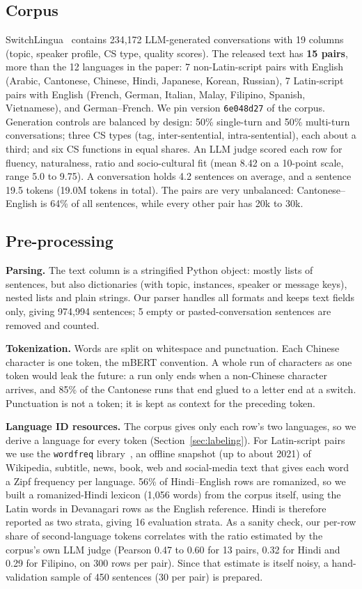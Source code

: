 \documentclass[sigconf,nonacm]{acmart}
\begin{document}
\subsection{Corpus}
SwitchLingua~\cite{xie2025switchlingua} contains 234,172 LLM-generated conversations with 19 columns (topic,
speaker profile, CS type, quality scores). The released text has \textbf{15 pairs}, more than the 12 languages
in the paper: 7 non-Latin-script pairs with English (Arabic, Cantonese, Chinese, Hindi, Japanese, Korean,
Russian), 7 Latin-script pairs with English (French, German, Italian, Malay, Filipino, Spanish, Vietnamese), and
German--French. We pin version \texttt{6e048d27} of the corpus. Generation controls are balanced by design:
50\% single-turn and 50\% multi-turn conversations; three CS types (tag, inter-sentential, intra-sentential),
each about a third; and six CS functions in equal shares. An LLM judge scored each row for fluency,
naturalness, ratio and socio-cultural fit (mean 8.42 on a 10-point scale, range 5.0 to 9.75). A
conversation holds 4.2 sentences on average, and a sentence 19.5 tokens (19.0M tokens in total). The pairs
are very unbalanced: Cantonese--English is 64\% of all sentences, while every other pair has 20k to 30k.

\subsection{Pre-processing}
\textbf{Parsing.} The text column is a stringified Python object: mostly lists of sentences, but also
dictionaries (with topic, instances, speaker or message keys), nested lists and plain strings. Our parser handles all formats and keeps text fields only, giving 974,994 sentences; 5 empty or
pasted-conversation sentences are removed and counted.

\textbf{Tokenization.} Words are split on whitespace and punctuation. Each Chinese character is one token, the
mBERT convention. A whole run of characters as one token would leak the future: a run only ends when a
non-Chinese character arrives, and 85\% of the Cantonese runs that end glued to a letter end at a switch.
Punctuation is not a token; it is kept as context for the preceding token.

\textbf{Language ID resources.} The corpus gives only each row's two languages, so we derive a language for
every token (Section~\ref{sec:labeling}). For Latin-script pairs we use the \texttt{wordfreq}
library~\cite{speer2022wordfreq}, an offline snapshot (up to about 2021) of Wikipedia, subtitle, news, book,
web and social-media text that gives each word a Zipf frequency per language. 56\% of Hindi--English rows are
romanized, so we built a romanized-Hindi lexicon (1,056 words) from the corpus itself, using the Latin words
in Devanagari rows as the English reference. Hindi is therefore reported as two strata, giving 16 evaluation
strata. As a sanity check, our per-row share of second-language tokens correlates with the ratio estimated
by the corpus's own LLM judge (Pearson 0.47 to 0.60 for 13 pairs, 0.32 for Hindi and 0.29 for Filipino, on
300 rows per pair). Since that estimate is itself noisy, a hand-validation sample of 450 sentences (30 per
pair) is prepared.
\end{document}
